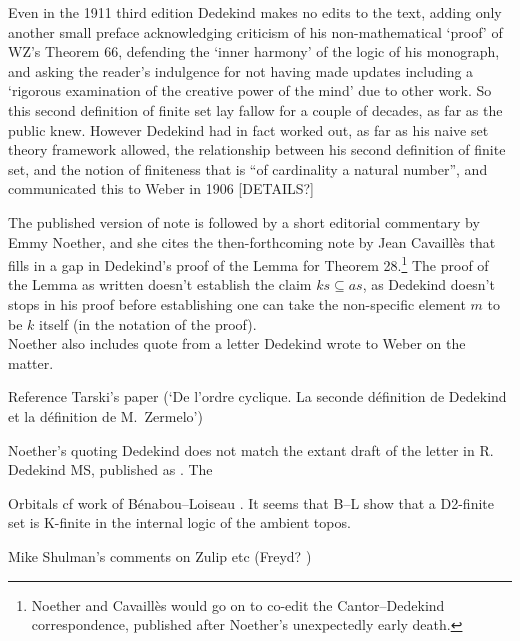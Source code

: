 \documentclass[leqno,hidelinks,10pt]{article}
\theoremstyle{definition}
\begin{document}
Even in the 1911 third edition Dedekind makes no edits to the text, adding only another small preface acknowledging criticism of his non-mathematical `proof' of WZ's Theorem 66, defending the `inner harmony' of the logic of his monograph, and asking the reader's indulgence for not having made updates including a `rigorous examination of the creative power of the mind' due to other work.
So this second definition of finite set lay fallow for a couple of decades, as far as the public knew.
However Dedekind had in fact worked out, as far as his naive set theory framework allowed, the relationship between his second definition of finite set, and the notion of finiteness that is ``of cardinality a natural number'', and communicated this to Weber in 1906 [DETAILS?]


The published version of note is followed by a short editorial commentary by Emmy Noether, and she cites the then-forthcoming note \cite{Cavailes_32} by Jean Cavaill\`es that fills in a gap in Dedekind's proof of the Lemma for Theorem 28.\footnote{Noether and Cavaill\`es would go on to co-edit the Cantor--Dedekind correspondence, published after Noether's unexpectedly early death.}
The proof of the Lemma as written doesn't establish the claim $ks\subseteq as$, as Dedekind doesn't stops in his proof before establishing one can take the non-specific element $m$ to be $k$ itself (in the notation of the proof). \\
Noether also includes quote from a letter Dedekind wrote to Weber on the matter.

Reference Tarski's paper \cite[\S 7]{Tarski_finite} (`De l'ordre cyclique. La seconde d\'efinition de Dedekind et la d\'efinition de M.\ Zermelo')

Noether's quoting Dedekind does not match the extant draft of the letter in R. Dedekind MS, published as \cite[p.\ 299]{Dedekind-Weber-letters}. The


Orbitals cf work of B\'enabou--Loiseau \cite{Benabou-Loiseau_94}. It seems that B--L show that a D2-finite set is K-finite in the internal logic of the ambient topos.


Mike Shulman's comments on Zulip etc (Freyd? \cite{Freyd_06})
\end{document}
